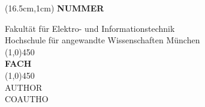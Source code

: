 \documentclass[a4paper]{scrreprt}
\begin{document}
\begin{titlepage}


\begin{textblock*}{50pt}(16.5cm,1cm)
	{\fontsize{60}{60} \textbf{\mbox{NUMMER}}}
\end{textblock*}


\centering
\vspace*{1cm}
\Large Fakult\"at f\"ur Elektro- und Informationstechnik \\
\Large Hochschule f\"ur angewandte Wissenschaften M\"unchen\\
\vspace*{4cm}
	\line(1,0){450}\\
	\Huge \textbf{FACH} \\
	\line(1,0){450}\\

\huge AUTHOR \\ COAUTHO \\
\end{titlepage}
\end{document}
